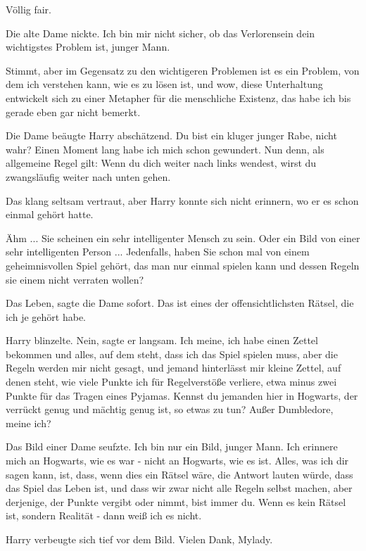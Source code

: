 \glqq Völlig fair.\grqq{}

Die alte Dame nickte. \glqq Ich bin mir nicht sicher, ob das Verlorensein dein
wichtigstes Problem ist, junger Mann.\grqq{}

\glqq Stimmt, aber im Gegensatz zu den wichtigeren Problemen ist es ein Problem,
von dem ich verstehen kann, wie es zu lösen ist, und wow, diese Unterhaltung
entwickelt sich zu einer Metapher für die menschliche Existenz, das habe ich bis
gerade eben gar nicht bemerkt.\grqq{}

Die Dame beäugte Harry abschätzend. \glqq Du bist ein kluger junger Rabe, nicht
wahr? Einen Moment lang habe ich mich schon gewundert. Nun denn, als allgemeine
Regel gilt: Wenn du dich weiter nach links wendest, wirst du zwangsläufig weiter
nach unten gehen.\grqq{}

Das klang seltsam vertraut, aber Harry konnte sich nicht erinnern, wo er es
schon einmal gehört hatte.

\glqq Ähm ... Sie scheinen ein sehr intelligenter Mensch zu sein. Oder ein Bild
von einer sehr intelligenten Person ... Jedenfalls, haben Sie schon mal von
einem geheimnisvollen Spiel gehört, das man nur einmal spielen kann und dessen
Regeln sie einem nicht verraten wollen?\grqq{}

\glqq Das Leben\grqq{}, sagte die Dame sofort. \glqq Das ist eines der
offensichtlichsten Rätsel, die ich je gehört habe.\grqq{}

Harry blinzelte. \glqq Nein\grqq{}, sagte er langsam. \glqq Ich meine, ich habe
einen Zettel bekommen und alles, auf dem steht, dass ich das Spiel spielen muss,
aber die Regeln werden mir nicht gesagt, und jemand hinterlässt mir kleine
Zettel, auf denen steht, wie viele Punkte ich für Regelverstöße verliere, etwa
minus zwei Punkte für das Tragen eines Pyjamas. Kennst du jemanden hier in
Hogwarts, der verrückt genug und mächtig genug ist, so etwas zu tun? Außer
Dumbledore, meine ich?\grqq{}

Das Bild einer Dame seufzte. \glqq Ich bin nur ein Bild, junger Mann. Ich
erinnere mich an Hogwarts, wie es war - nicht an Hogwarts, wie es ist. Alles,
was ich dir sagen kann, ist, dass, wenn dies ein Rätsel wäre, die Antwort lauten
würde, dass das Spiel das Leben ist, und dass wir zwar nicht alle Regeln selbst
machen, aber derjenige, der Punkte vergibt oder nimmt, bist immer du. Wenn es
kein Rätsel ist, sondern Realität - dann weiß ich es nicht.\grqq{}

Harry verbeugte sich tief vor dem Bild. \glqq Vielen Dank, Mylady.\grqq{}

